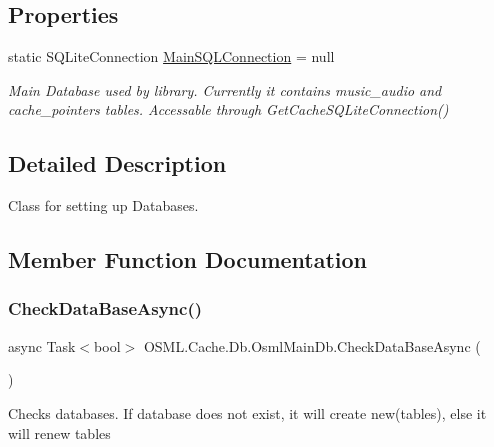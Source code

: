 \subsection*{Properties}
\begin{DoxyCompactItemize}
\item 
static S\+Q\+Lite\+Connection \mbox{\hyperlink{classOSML_1_1Cache_1_1Db_1_1OsmlMainDb_a5e00588ce080185aa96f8ec019597b70}{Main\+S\+Q\+L\+Connection}} = null
\begin{DoxyCompactList}\small\item\em Main Database used by library. Currently it contains music\+\_\+audio and cache\+\_\+pointers tables. Accessable through Get\+Cache\+S\+Q\+Lite\+Connection() \end{DoxyCompactList}\end{DoxyCompactItemize}


\subsection{Detailed Description}
Class for setting up Databases. 



\subsection{Member Function Documentation}
\mbox{\label{classOSML_1_1Cache_1_1Db_1_1OsmlMainDb_a4748246289a9eea7ef4b8dbe25c92c75}} 
\subsubsection{\texorpdfstring{CheckDataBaseAsync()}{CheckDataBaseAsync()}}
{\footnotesize\ttfamily async Task$<$bool$>$ O\+S\+M\+L.\+Cache.\+Db.\+Osml\+Main\+Db.\+Check\+Data\+Base\+Async (\begin{DoxyParamCaption}{ }\end{DoxyParamCaption})\hspace{0.3cm}{\ttfamily [inline]}}



Checks databases. If database does not exist, it will create new(tables), else it will renew tables 

